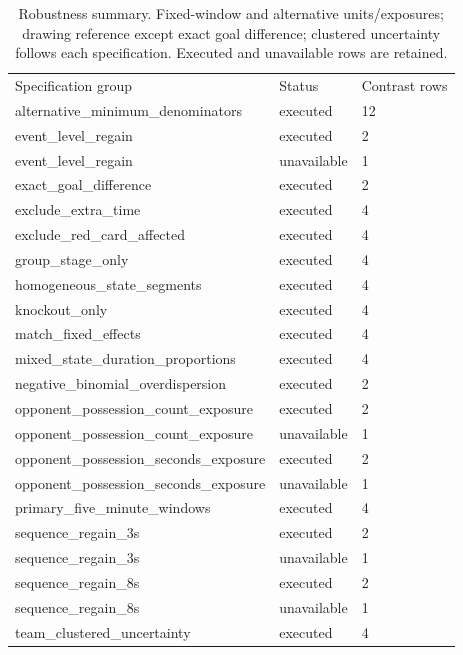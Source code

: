 \begin{table}[ht]
\centering
\small
\caption{Robustness summary. Fixed-window and alternative units/exposures; drawing reference except exact goal difference; clustered uncertainty follows each specification. Executed and unavailable rows are retained.}
\begin{tabular}{lll}
\hline
Specification group & Status & Contrast rows \\
alternative\_minimum\_denominators & executed & 12 \\
event\_level\_regain & executed & 2 \\
event\_level\_regain & unavailable & 1 \\
exact\_goal\_difference & executed & 2 \\
exclude\_extra\_time & executed & 4 \\
exclude\_red\_card\_affected & executed & 4 \\
group\_stage\_only & executed & 4 \\
homogeneous\_state\_segments & executed & 4 \\
knockout\_only & executed & 4 \\
match\_fixed\_effects & executed & 4 \\
mixed\_state\_duration\_proportions & executed & 4 \\
negative\_binomial\_overdispersion & executed & 2 \\
opponent\_possession\_count\_exposure & executed & 2 \\
opponent\_possession\_count\_exposure & unavailable & 1 \\
opponent\_possession\_seconds\_exposure & executed & 2 \\
opponent\_possession\_seconds\_exposure & unavailable & 1 \\
primary\_five\_minute\_windows & executed & 4 \\
sequence\_regain\_3s & executed & 2 \\
sequence\_regain\_3s & unavailable & 1 \\
sequence\_regain\_8s & executed & 2 \\
sequence\_regain\_8s & unavailable & 1 \\
team\_clustered\_uncertainty & executed & 4 \\
\hline
\end{tabular}
\end{table}
